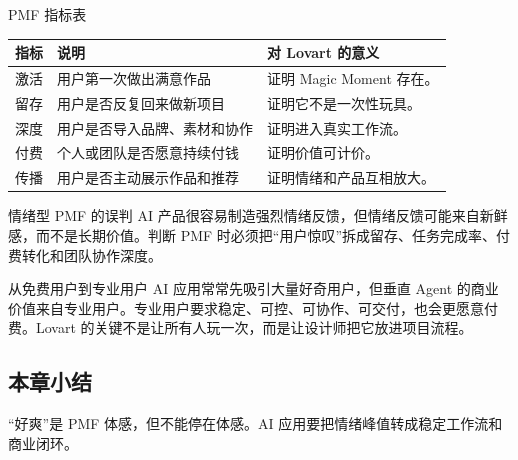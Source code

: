 \begin{knowledgebox}{PMF 指标表}
\begin{tabularx}{\textwidth}{p{}p{}X}
\toprule
指标 & 说明 & 对 Lovart 的意义 \\
\midrule
激活 & 用户第一次做出满意作品 & 证明 Magic Moment 存在。 \\
留存 & 用户是否反复回来做新项目 & 证明它不是一次性玩具。 \\
深度 & 用户是否导入品牌、素材和协作 & 证明进入真实工作流。 \\
付费 & 个人或团队是否愿意持续付钱 & 证明价值可计价。 \\
传播 & 用户是否主动展示作品和推荐 & 证明情绪和产品互相放大。 \\
\bottomrule
\end{tabularx}
\end{knowledgebox}

\begin{warningbox}{情绪型 PMF 的误判}
AI 产品很容易制造强烈情绪反馈，但情绪反馈可能来自新鲜感，而不是长期价值。判断 PMF 时必须把“用户惊叹”拆成留存、任务完成率、付费转化和团队协作深度。
\end{warningbox}

\begin{knowledgebox}{从免费用户到专业用户}
AI 应用常常先吸引大量好奇用户，但垂直 Agent 的商业价值来自专业用户。专业用户要求稳定、可控、可协作、可交付，也会更愿意付费。Lovart 的关键不是让所有人玩一次，而是让设计师把它放进项目流程。
\end{knowledgebox}

\subsection{本章小结}

“好爽”是 PMF 体感，但不能停在体感。AI 应用要把情绪峰值转成稳定工作流和商业闭环。

